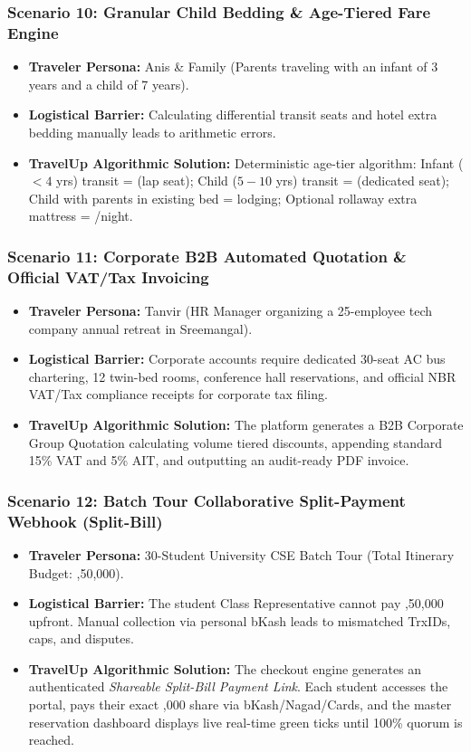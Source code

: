 \documentclass[11pt,a4paper]{article}
\begin{document}
\subsubsection{Scenario 10: Granular Child Bedding \& Age-Tiered Fare Engine}
\begin{itemize}[leftmargin=*]
    \item \textbf{Traveler Persona:} Anis \& Family (Parents traveling with an infant of 3 years and a child of 7 years).
    \item \textbf{Logistical Barrier:} Calculating differential transit seats and hotel extra bedding manually leads to arithmetic errors.
    \item \textbf{TravelUp Algorithmic Solution:} Deterministic age-tier algorithm: Infant ($<4$ yrs) transit =  (lap seat); Child ($5-10$ yrs) transit =  (dedicated seat); Child with parents in existing bed =  lodging; Optional rollaway extra mattress = /night.
\end{itemize}

\subsubsection{Scenario 11: Corporate B2B Automated Quotation \& Official VAT/Tax Invoicing}
\begin{itemize}[leftmargin=*]
    \item \textbf{Traveler Persona:} Tanvir (HR Manager organizing a 25-employee tech company annual retreat in Sreemangal).
    \item \textbf{Logistical Barrier:} Corporate accounts require dedicated 30-seat AC bus chartering, 12 twin-bed rooms, conference hall reservations, and official NBR VAT/Tax compliance receipts for corporate tax filing.
    \item \textbf{TravelUp Algorithmic Solution:} The platform generates a B2B Corporate Group Quotation calculating volume tiered discounts, appending standard 15\% VAT and 5\% AIT, and outputting an audit-ready PDF invoice.
\end{itemize}

\subsubsection{Scenario 12: Batch Tour Collaborative Split-Payment Webhook (Split-Bill)}
\begin{itemize}[leftmargin=*]
    \item \textbf{Traveler Persona:} 30-Student University CSE Batch Tour (Total Itinerary Budget: ,50,000).
    \item \textbf{Logistical Barrier:} The student Class Representative cannot pay ,50,000 upfront. Manual collection via personal bKash leads to mismatched TrxIDs, caps, and disputes.
    \item \textbf{TravelUp Algorithmic Solution:} The checkout engine generates an authenticated \textit{Shareable Split-Bill Payment Link}. Each student accesses the portal, pays their exact ,000 share via bKash/Nagad/Cards, and the master reservation dashboard displays live real-time green ticks until 100\% quorum is reached.
\end{itemize}
\end{document}
